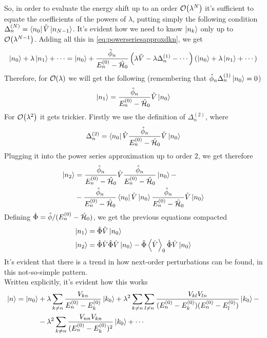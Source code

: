 \documentclass[../qm.tex]{subfiles}
\begin{document}
	So, in order to evaluate the energy shift up to an order $\order{\lambda^N}$ it's sufficient to equate the coefficients of the powers of $\lambda$, putting simply the following condition $\Delta_n^{(N)}=\bra{n_0}\hat{V}\ket{n_{N-1}}$. It's evident how we need to know $\ket{n_k}$ only up to $\order{\lambda^{N-1}}$. Adding all this in \eqref{eq:powerseriesapproxdkn}, we get
	\begin{equation*}
		\ket{n_0}+\lambda\ket{n_1}+\cdots=\ket{n_0}+\frac{\hat{\phi}_n}{E_n^{(0)}-\hat{\mathcal{H}}_0}\left( \lambda\hat{V}-\lambda\Delta_n^{(1)}-\cdots \right)\left( \ket{n_0}+\lambda\ket{n_1}+\cdots \right)
	\end{equation*}
	Therefore, for $\order{\lambda}$ we will get the following (remembering that $\hat{\phi}_n\Delta^{(1)}_n\ket{n_0}=0$)
	\begin{equation}
		\ket{n_1}=\frac{\hat{\phi}_n}{E_n^{(0)}-\hat{\mathcal{H}}_0}\hat{V}\ket{n_0}
		\label{eq:order1ptt}
	\end{equation}
	For $\order{\lambda^2}$ it gets trickier. Firstly we use the definition of $\Delta_n^{(2)}$, where
	\begin{equation*}
		\Delta_n^{(2)}=\bra{n_0}\hat{V}\frac{\hat{\phi}_n}{E_n^{(0)}-\hat{\mathcal{H}}_0}\hat{V}\ket{n_0}
	\end{equation*}
	Plugging it into the power series approximation up to order $2$, we get therefore
	\begin{equation}
		\begin{aligned}
			\ket{n_2}&=\frac{\hat{\phi}_n}{E_n^{(0)}-\hat{\mathcal{H}}_0}\hat{V}\frac{\hat{\phi}_n}{E_n^{(0)}-\hat{\mathcal{H}}_0}\ket{n_0}-\\
			&-\frac{\hat{\phi}_n}{E_n^{(0)}-\hat{\mathcal{H}}_0}\bra{n_0}\hat{V}\ket{n_0}\frac{\hat{\phi}_n}{E_n^{(0)}-\hat{\mathcal{H}}_0}\hat{V}\ket{n_0}
		\end{aligned}
		\label{eq:order2ptt}
	\end{equation}
	Defining $\hat{\Phi}=\hat{\phi}/(E_n^{(0)}-\hat{\mathcal{H}}_0)$, we get the previous equations compacted
	\begin{equation}
		\begin{aligned}
			\ket{n_1}&=\hat{\Phi}\hat{V}\ket{n_0}\\
			\ket{n_2}&=\hat{\Phi}\hat{V}\hat{\Phi}\hat{V}\ket{n_0}-\hat{\Phi}\expval{\hat{V}}_0\hat{\Phi}\hat{V}\ket{n_0}
		\end{aligned}
		\label{eq:compact}
	\end{equation}
	It's evident that there is a trend in how next-order perturbations can be found, in this not-so-simple pattern.\\
	Written explicitly, it's evident how this works
	\begin{equation*}
		\begin{aligned}
			\ket{n}=\ket{n_0}&+\lambda\sum_{k\ne n}\frac{V_{kn}}{E_n^{(0)}-E_k^{(0)}}\ket{k_0}+\lambda^2\sum_{k\ne n}\sum_{l\ne n}\frac{V_{kl}V_{ln}}{(E_n^{(0)}-E_k^{(0)})(E_n^{(0)}-E_l^{(0)})}\ket{k_0}-\\
			&-\lambda^2\sum_{k\ne n}\frac{V_{nn}V_{kn}}{(E_n^{(0)}-E_k^{(0)})^2}\ket{k_0}+\cdots
		\end{aligned}
	\end{equation*}
\end{document}
